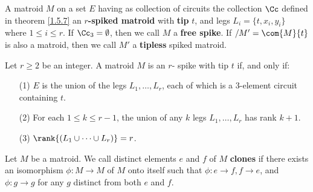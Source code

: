 \begin{definition}
    A matroid $M$ on a set $E$ having as collection of circuits the collection
    $\Cc$ defined in theorem \ref{1.5.7} an  \textbf{$r$-spiked matroid} with
    \textbf{tip} $t$, and legs  $L_i=\{t,x_i,y_i\}$ where $1 \leq i \leq r$. If
     $\Cc_3=\emptyset$, then we call $M$ a  \textbf{free spike}. If
     $/M'=\com{M}{t}$ is also a matroid, then we call $M'$ a \textbf{tipless}
     spiked matroid.
\end{definition}

\begin{theorem}\label{1.5.8}
    Let $r \geq 2$ be an integer. A matroid  $M$ is an  $r$- spike with tip $t$
    if, and only if:
    \begin{enumerate}
        \item[(1)] $E$ is the union of the legs  $L_1, \dots, L_r$, each of
            which is a $3$-element circuit containing  $t$.

        \item[(2)] For each $1 \leq k \leq r-1$, the union of any  $k$ legs
            $L_1, \dots, L_r$ has rank $k+1$.

        \item[(3)] $\rank{(L_1 \cup \dots \cup L_r)}=r$.
    \end{enumerate}
\end{theorem}

\begin{definition}
    Let $M$ be a matroid. We call distinct elements  $e$ and  $f$ of  $M$
    \textbf{clones} if there exists an isomorphism $\phi:M \rightarrow M$ of $M$
    onto itself such that $\phi:e \rightarrow f,f \rightarrow e$, and $\phi:g
    \rightarrow g$ for any $g$ distinct from both  $e$ and  $f$.
\end{definition}
